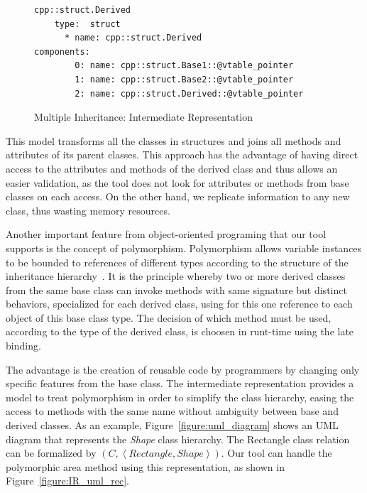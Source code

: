 \documentclass[a4paper]{llncs}
\begin{document}
\begin{figure}[h]
\centering
\begin{minipage}{0.9\textwidth}
\begin{lstlisting}[style=nonumbers]
cpp::struct.Derived
    type:  struct
      * name: cpp::struct.Derived
components:
        0: name: cpp::struct.Base1::@vtable_pointer
        1: name: cpp::struct.Base2::@vtable_pointer
        2: name: cpp::struct.Derived::@vtable_pointer
\end{lstlisting}
\end{minipage}
\caption{Multiple Inheritance: Intermediate Representation}
\label{figure:multiple-inheritance-IR}
\end{figure}

This model transforms all the classes in structures and joins all
methods and attributes of its parent classes. This approach has
the advantage of having direct access to the attributes and methods
of the derived class and thus allows an easier validation, as the tool
does not look for attributes or methods from base classes on each access.
On the other hand, we replicate information to any new class, thus wasting
memory resources.

Another important feature from object-oriented programing that our tool
supports is the concept of polymorphism. Polymorphism allows variable instances to be
bounded to references of different types according to the structure of the
inheritance hierarchy~\cite{Alexander02}.
It is the principle whereby two or more derived classes from the same base
class can invoke methods with same signature but distinct behaviors, specialized
for each derived class, using for this one reference to each object of this base class type.
The decision of which method must be used, according to the type of the
derived class, is choosen in runt-time using the late binding.

The advantage is the creation of reusable code by programmers by changing only
specific features from the base class.
The intermediate representation provides a model to treat polymorphism in
order to simplify the class hierarchy,
easing the access to methods with the same name without ambiguity between
base and derived classes.
As an example, Figure~\ref{figure:uml_diagram} shows an UML diagram
that represents the \textit{Shape} class hierarchy.
The Rectangle class relation can be formalized by
$\left(C, \left\langle Rectangle, Shape \right\rangle \right)$. Our tool can
handle the polymorphic area method using this representation,
as shown in Figure~\ref{figure:IR_uml_rec}.
\end{document}
